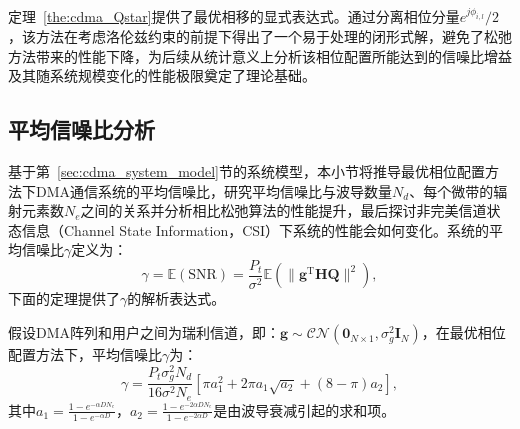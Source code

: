 定理~\ref{the:cdma_Qstar}提供了最优相移的显式表达式。通过分离相位分量$e^{j \phi_{i,l}}/2$，该方法在考虑洛伦兹约束的前提下得出了一个易于处理的闭形式解，避免了松弛方法带来的性能下降，为后续从统计意义上分析该相位配置所能达到的信噪比增益及其随系统规模变化的性能极限奠定了理论基础。

\subsection{平均信噪比分析}

基于第~\ref{sec:cdma_system_model}节的系统模型，本小节将推导最优相位配置方法下DMA通信系统的平均信噪比，研究平均信噪比与波导数量$N_d$、每个微带的辐射元素数$N_e$之间的关系并分析相比松弛算法的性能提升，最后探讨非完美信道状态信息（Channel State Information，CSI）下系统的性能会如何变化。系统的平均信噪比$\gamma$定义为：
\begin{equation}\label{eq:cdma_gamma}
	\gamma = \mathbb{E}(\mathrm{SNR}) = 
	\frac{P_{t}}{\sigma^2}\mathbb{E}\left(\|\bm{g}^\mathrm{T} \bm{HQ}\|^2\right),
\end{equation}
下面的定理提供了$\gamma$的解析表达式。

\begin{theorem}\label{the:cdma_gamma}
	假设DMA阵列和用户之间为瑞利信道，即：$\bm g \sim \mathcal{CN}(\bm 0_{N\times1}, \sigma_g^2 \bm I_N)$，在最优相位配置方法下，平均信噪比$\gamma$为：
	\begin{equation}\label{eq:cdma_theorem_gamma}
		\gamma = \frac{P_{t}\sigma_g^2 N_d}{16\sigma^2 N_e}\left[\pi a_1^2 + 2\pi a_1\sqrt{a_2} + (8-\pi) a_2\right],
	\end{equation}
	其中$a_1 = \frac{1 - e^{-\alpha D N_e}}{1 - e^{-\alpha D}}$，$a_2 = \frac{1 - e^{-2\alpha D N_e}}{1 - e^{-2\alpha D}}$是由波导衰减引起的求和项。
\end{theorem}


